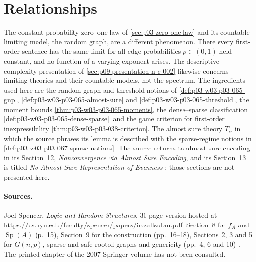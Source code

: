 \section{Relationships}
\label{sec:p03-w03-p03-069-relationships}

The constant-probability zero--one law of \cref{sec:p03-zero-one-law} and
its countable limiting model, the random graph, are a different phenomenon.
There every first-order sentence has the same limit for all edge
probabilities \(p\in(0,1)\) held constant, and no function of a varying
exponent arises.  The descriptive-complexity presentation of
\cref{sec:p09-presentation-n-c-002} likewise concerns limiting theories and
their countable models, not the spectrum.  The ingredients used here are the
random graph and threshold notions of \cref{def:p03-w03-p03-065-gnp},
\cref{def:p03-w03-p03-065-almost-sure} and
\cref{def:p03-w03-p03-065-threshold}, the moment bounds
\cref{thm:p03-w03-p03-065-moments}, the dense--sparse classification
\cref{def:p03-w03-p03-065-dense-sparse}, and the game criterion for
first-order inexpressibility \cref{thm:p03-w03-p03-038-criterion}.  The
almost sure theory \(T_\alpha\) in which the source phrases its lemma is
described with the sparse-regime notions in
\cref{def:p03-w03-p03-067-sparse-notions}.  The source returns to almost sure
encoding in its Section~12, \emph{Nonconvergence via Almost Sure Encoding}, and its
Section~13 is titled \emph{No Almost Sure Representation of Evenness}
\cite[pp.~22 and 25]{Spencer2007LogicRandomStructuresAuthor}; those sections
are not presented here.

\paragraph{Sources.}
Joel Spencer, \emph{Logic and Random Structures}, 30-page version hosted at
\url{https://cs.nyu.edu/faculty/spencer/papers/ircsallsubm.pdf}: Section~8
for \(f_A\) and \(\operatorname{Sp}(A)\) (p.~15), Section~9 for the
construction (pp.~16--18), Sections~2, 3 and 5 for \(G(n,p)\), sparse and
safe rooted graphs and genericity (pp.~4, 6 and 10)
\cite{Spencer2007LogicRandomStructuresAuthor}.  The printed chapter of the
2007 Springer volume has not been consulted.
